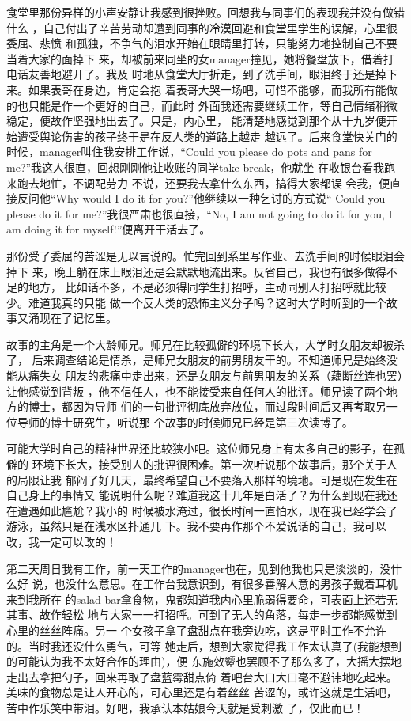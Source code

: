 \documentclass[12pt]{book}
\begin{document}
食堂里那份异样的小声安静让我感到很挫败。回想我与同事们的表现我并没有做错什么
，自己付出了辛苦劳动却遭到同事的冷漠回避和食堂里学生的误解，心里很委屈、悲愤
和孤独，不争气的泪水开始在眼睛里打转，只能努力地控制自己不要当着大家的面掉下
来，却被前来同坐的女manager撞见，她将餐盘放下，借着打电话友善地避开了。我及
时地从食堂大厅折走，到了洗手间，眼泪终于还是掉下来。如果表哥在身边，肯定会抱
着表哥大哭一场吧，可惜不能够，而我所有能做的也只能是作一个更好的自己，而此时
外面我还需要继续工作，等自己情绪稍微稳定，便故作坚强地出去了。只是，内心里，
能清楚地感觉到那个从十九岁便开始遭受舆论伤害的孩子终于是在反人类的道路上越走
越远了。后来食堂快关门的时候，manager叫住我安排工作说，“Could you please do
pots and pans for me?”我这人很直，回想刚刚他让收账的同学take break，他就坐
在收银台看我跑来跑去地忙，不调配劳力 不说，还要我去拿什么东西，搞得大家都误
会我，便直接反问他“Why would I do it for you?”他继续以一种乞讨的方式说“
Could you please do it for me?”我很严肃也很直接，“No,  I am not  going to 
do it for you, I am doing it for myself!”便离开干活去了。

那份受了委屈的苦涩是无以言说的。忙完回到系里写作业、去洗手间的时候眼泪会掉下
来，晚上躺在床上眼泪还是会默默地流出来。反省自己，我也有很多做得不足的地方，
比如话不多，不是必须得同学生打招呼，主动同别人打招呼就比较少。难道我真的只能
做一个反人类的恐怖主义分子吗？这时大学时听到的一个故事又涌现在了记忆里。

故事的主角是一个大龄师兄。师兄在比较孤僻的环境下长大，大学时女朋友却被杀了，
后来调查结论是情杀，是师兄女朋友的前男朋友干的。不知道师兄是始终没能从痛失女
朋友的悲痛中走出来，还是女朋友与前男朋友的关系（藕断丝连也罢）让他感觉到背叛
，他不信任人，也不能接受来自任何人的批评。师兄读了两个地方的博士，都因为导师
们的一句批评彻底放弃放位，而过段时间后又再考取另一位导师的博士研究生，听说那
个故事的时候师兄已经是第三次读博了。

可能大学时自己的精神世界还比较狭小吧。这位师兄身上有太多自己的影子，在孤僻的
环境下长大，接受别人的批评很困难。第一次听说那个故事后，那个关于人的局限让我
郁闷了好几天，最终希望自己不要落入那样的境地。可是现在发生在自己身上的事情又
能说明什么呢？难道我这十几年是白活了？为什么到现在我还在遭遇如此尴尬？我小的
时候被水淹过，很长时间一直怕水，现在我已经学会了游泳，虽然只是在浅水区扑通几
下。我不要再作那个不爱说话的自己，我可以改，我一定可以改的！

第二天周日我有工作，前一天工作的manager也在，见到他我也只是淡淡的，没什么好
说，也没什么意思。在工作台我意识到，有很多善解人意的男孩子戴着耳机来到我所在
的salad bar拿食物，鬼都知道我内心里脆弱得要命，可表面上还若无其事、故作轻松
地与大家一一打招呼。可到了无人的角落，每走一步都能感觉到心里的丝丝阵痛。另一
个女孩子拿了盘甜点在我旁边吃，这是平时工作不允许的。当时我还没什么勇气，可等
她走后，想到大家觉得我工作太认真了(我能想到的可能认为我不太好合作的理由)，便
东施效颦也罢顾不了那么多了，大摇大摆地走出去拿把勺子，回来再取了盘蓝霉甜点倚
着吧台大口大口毫不避讳地吃起来。美味的食物总是让人开心的，可心里还是有着丝丝
苦涩的，或许这就是生活吧，苦中作乐笑中带泪。好吧，我承认本姑娘今天就是受刺激
了，仅此而已！
\end{document}
